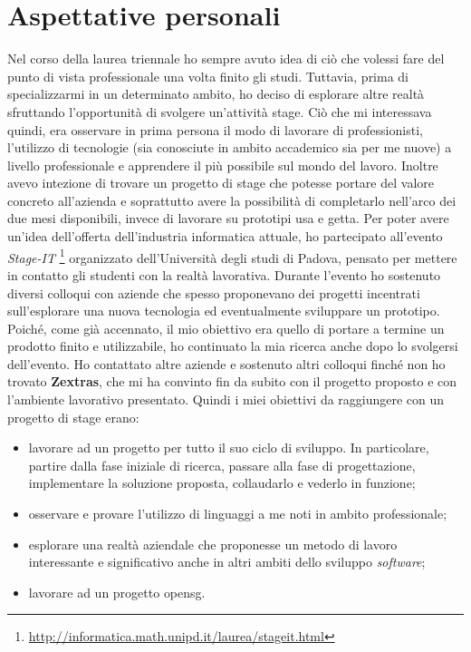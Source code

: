 \section{Aspettative personali}\label{sec:aspettative_personali}
Nel corso della laurea triennale ho sempre avuto idea di ciò che volessi fare del punto di vista professionale una volta finito gli studi. Tuttavia, prima di specializzarmi in un determinato ambito, ho deciso di esplorare altre realtà sfruttando l'opportunità di svolgere un'attività stage. Ciò che mi interessava quindi, era osservare in prima persona il modo di lavorare di professionisti, l'utilizzo di tecnologie (sia conosciute in ambito accademico sia per me nuove) a livello professionale e apprendere il più possibile sul mondo del lavoro. Inoltre avevo intezione di trovare un progetto di stage che potesse portare del valore concreto all'azienda e soprattutto avere la possibilità di completarlo nell'arco dei due mesi disponibili, invece di lavorare su prototipi usa e getta.
Per poter avere un'idea dell'offerta dell'industria informatica attuale, ho partecipato all'evento \textit{Stage-IT} \footnote{\url{http://informatica.math.unipd.it/laurea/stageit.html}} organizzato dell'Università degli studi di Padova, pensato per mettere in contatto gli studenti con la realtà lavorativa. Durante l'evento ho sostenuto diversi colloqui con aziende che spesso proponevano dei progetti incentrati sull'esplorare una nuova tecnologia ed eventualmente sviluppare un prototipo. Poiché, come già accennato, il mio obiettivo era quello di portare a termine un prodotto finito e utilizzabile, ho continuato la mia ricerca anche dopo lo svolgersi dell'evento. Ho contattato altre aziende e sostenuto altri colloqui finché non ho trovato \textbf{Zextras}, che mi ha convinto fin da subito con il progetto proposto e con l'ambiente lavorativo presentato. Quindi i miei obiettivi da raggiungere con un progetto di stage erano:
\begin{itemize}
    \item lavorare ad un progetto per tutto il suo ciclo di sviluppo. In particolare, partire dalla fase iniziale di ricerca, passare alla fase di progettazione, implementare la soluzione proposta, collaudarlo e vederlo in funzione;
    \item osservare e provare l'utilizzo di linguaggi a me noti in ambito professionale;
    \item esplorare una realtà aziendale che proponesse un metodo di lavoro interessante e significativo anche in altri ambiti dello sviluppo \textit{software};
    \item lavorare ad un progetto \gls{opensg}.
\end{itemize}

